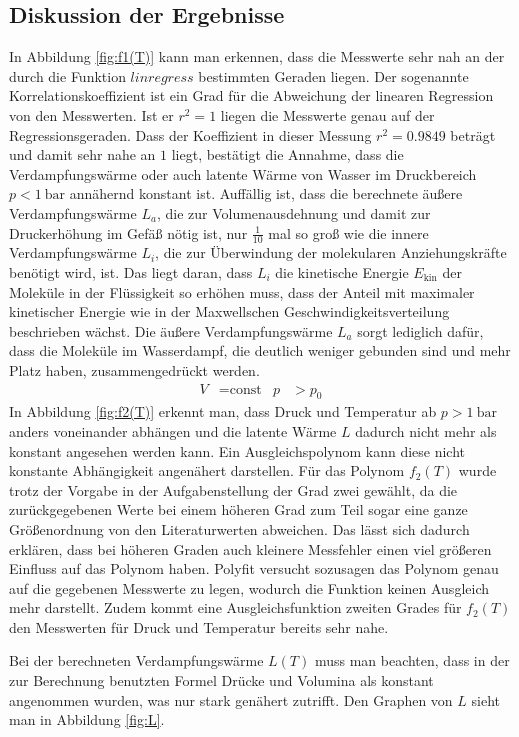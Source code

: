 \subsection{Diskussion der Ergebnisse}
In Abbildung \ref{fig:f1(T)} kann man erkennen, dass die Messwerte sehr nah
an der durch die Funktion $linregress$ bestimmten Geraden liegen. Der
sogenannte Korrelationskoeffizient ist ein Grad für die Abweichung der linearen
Regression von den Messwerten. Ist er $r^2 = 1$ liegen die Messwerte genau
auf der Regressionsgeraden. Dass der Koeffizient in dieser Messung
$r^2 = 0.9849$ beträgt und damit sehr nahe an $1$ liegt,
bestätigt die Annahme, dass die Verdampfungswärme oder auch
latente Wärme von Wasser im
Druckbereich $p < \SI{1}{\bar}$ annähernd konstant ist. Auffällig ist, dass
die berechnete äußere Verdampfungswärme $L_a$, die zur Volumenausdehnung und
damit zur Druckerhöhung im Gefäß nötig ist, nur $\frac{1}{10}$ mal so groß wie
die innere Verdampfungswärme
$L_i$, die zur Überwindung der molekularen Anziehungskräfte
benötigt wird, ist.
Das liegt daran, dass $L_i$ die kinetische Energie $E_\text{kin}$ der Moleküle in
der Flüssigkeit so erhöhen muss, dass der Anteil mit maximaler kinetischer
Energie wie in der Maxwellschen Geschwindigkeitsverteilung beschrieben wächst.
Die äußere Verdampfungswärme $L_a$ sorgt lediglich dafür, dass die Moleküle
im Wasserdampf, die deutlich weniger gebunden sind und mehr Platz haben,
zusammengedrückt werden.
\begin{align}
  V & = \text{const} & p & > p_0
\end{align}
In Abbildung \ref{fig:f2(T)} erkennt man, dass Druck und Temperatur ab
$p > \SI{1}{\bar}$ anders voneinander abhängen und die latente Wärme $L$
dadurch nicht mehr als konstant angesehen werden kann. Ein Ausgleichspolynom
kann diese nicht konstante Abhängigkeit angenähert darstellen.
Für das Polynom $f_2(T)$ wurde trotz der Vorgabe in der Aufgabenstellung
der Grad zwei gewählt, da die zurückgegebenen Werte
bei einem höheren Grad zum Teil sogar eine ganze Größenordnung von den
Literaturwerten abweichen.
Das lässt sich dadurch erklären, dass bei höheren Graden auch kleinere
Messfehler einen viel größeren Einfluss auf das Polynom haben. Polyfit
versucht sozusagen das Polynom genau auf die gegebenen Messwerte zu legen,
wodurch die Funktion keinen Ausgleich mehr darstellt.
Zudem kommt eine Ausgleichsfunktion zweiten Grades für $f_2(T)$
den Messwerten für Druck und Temperatur bereits sehr nahe.

Bei der berechneten Verdampfungswärme $L(T)$ muss man beachten, dass in der
zur Berechnung benutzten Formel Drücke und Volumina als konstant
angenommen wurden, was nur stark genähert zutrifft. Den Graphen von $L$ sieht
man in Abbildung \ref{fig:L}.

